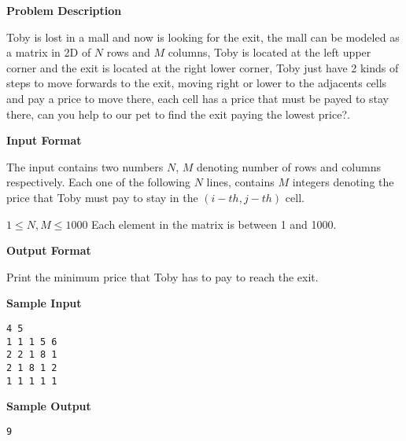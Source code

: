 \textbf{\large Problem Description}

Toby is lost in a mall and now is looking for the exit, the mall can be modeled as a matrix in 2D of $N$ rows and $M$ columns, Toby is located at the left upper corner and the exit is located at the right lower corner, Toby just have 2 kinds of steps to move forwards to the exit, moving  right or lower to the adjacents cells  and pay a price to move there, each cell has a price that must be payed to stay there, can you help to our pet to find the exit paying the lowest price?.

\textbf{\large Input Format}

The input contains two numbers $N$, $M$ denoting number of rows and columns respectively. Each one of the following $N$ lines, contains $M$ integers denoting the price that Toby must pay to stay in the $(i-th, j-th)$ cell.

$1 \le N, M \le 1000$
Each element in the matrix is between 1 and 1000.

\textbf{\large Output Format}

Print the minimum price that Toby has to pay to reach the exit.

\textbf{\large Sample Input}

\begin{verbatim}
4 5
1 1 1 5 6
2 2 1 8 1
2 1 8 1 2
1 1 1 1 1
\end{verbatim}

\textbf{\large Sample Output}

\begin{verbatim}
9
\end{verbatim}
